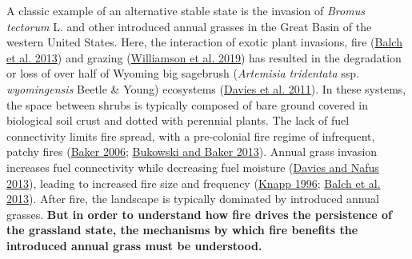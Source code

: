 \documentclass[
  12pt,
]{article}
\begin{document}
A classic example of an alternative stable state is the invasion of
\emph{Bromus tectorum} L. and other introduced annual grasses in the
Great Basin of the western United States. Here, the interaction of
exotic plant invasions, fire (\protect\hyperlink{ref-Balch2013}{Balch et
al. 2013}) and grazing
(\protect\hyperlink{ref-Williamson2019}{Williamson et al. 2019}) has
resulted in the degradation or loss of over half of Wyoming big
sagebrush (\emph{Artemisia tridentata} ssp. \emph{wyomingensis} Beetle
\& Young) ecosystems (\protect\hyperlink{ref-Davies2011}{Davies et al.
2011}). In these systems, the space between shrubs is typically composed
of bare ground covered in biological soil crust and dotted with
perennial plants. The lack of fuel connectivity limits fire spread, with
a pre-colonial fire regime of infrequent, patchy fires
(\protect\hyperlink{ref-Baker2006}{Baker 2006};
\protect\hyperlink{ref-Bukowski2013}{Bukowski and Baker 2013}). Annual
grass invasion increases fuel connectivity while decreasing fuel
moisture (\protect\hyperlink{ref-Davies2013}{Davies and Nafus 2013}),
leading to increased fire size and frequency
(\protect\hyperlink{ref-Knapp1996}{Knapp 1996};
\protect\hyperlink{ref-Balch2013}{Balch et al. 2013}). After fire, the
landscape is typically dominated by introduced annual grasses.
\textbf{But in order to understand how fire drives the persistence of
the grassland state, the mechanisms by which fire benefits the
introduced annual grass must be understood.}
\end{document}
